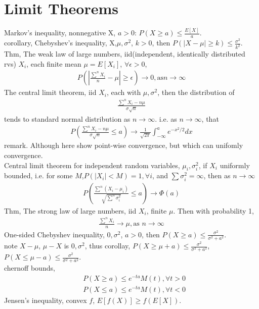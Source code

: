 \documentclass[paper=a4, fontsize=11pt]{scrartcl} %
\numberwithin{equation}{section} %
\numberwithin{figure}{section} %
\numberwithin{table}{section} %
\begin{document}
\section{Limit Theorems}
Markov's inequality, nonnegative X, $a>0$: $P(X\geq a) \leq \frac{E[X]}{a}$.\\
corollary, Chebyshev's inequality, X,$\mu,\sigma^2$, $k>0$, then  $P(|X-\mu|\geq k)\leq \frac{\sigma^2}{k^2}$.\\
Thm, The weak law of large numbers, iid(independent, identically distributed rvs) $X_i$, each finite mean $\mu=E[X_i]$, $\forall \epsilon>0$,
\begin{align}
	P(|\frac{\sum^n X_i}{n} - \mu|\geq \epsilon) \rightarrow 0, \text{as} n\rightarrow \infty
\end{align}
The central limit theorem, iid $X_i$, each with $\mu,\sigma^2$, then the distribution of 
\begin{align}
	\frac{\sum^n X_i - n\mu}{\sigma \sqrt{n}}
\end{align}
tends to standard normal distribution as $n\rightarrow \infty$. i.e. as $n\rightarrow \infty$, that
\begin{align}
	P\left(\frac{\sum^n X_i - n\mu}{\sigma \sqrt{n}} \leq a\right) \rightarrow 
	\frac{1}{\sqrt{2\pi}}\int_{-\infty}^a e^{-x^2/2}dx
\end{align}
remark. Although here show point-wise convergence, but which can unifomly convergence.\\
Central limit theorem for independent random variables, $\mu_i,\sigma_i^2$, if $X_i$ uniformly bounded, i.e. for some $M$,$P(|X_i|<M)=1,\forall i$, and $\sum \sigma_i^2=\infty$, then as $n\rightarrow \infty$
\begin{align}
	P\left(\frac{\sum^n (X_i-\mu_i)}{\sqrt{\sum^n \sigma_i^2}}\leq a\right)\rightarrow \Phi(a)
\end{align}
Thm, The strong law of large numbers, iid $X_i$, finite $\mu$. Then with probability 1,
\begin{align}
	\frac{\sum^n X_i}{n} \rightarrow \mu,\text{as }n\rightarrow \infty
\end{align}
One-sided Chebyshev inequality, $0,\sigma^2$, $a>0$, then $P(X\geq a)\leq \frac{\sigma^2}{\sigma^2+a^2}$.\\
note $X-\mu$, $\mu-X$ is $0,\sigma^2$, thus
corollay, $P(X\geq \mu +a )\leq \frac{\sigma^2}{\sigma^2+a^2}$, $P(X\leq \mu -a)\leq \frac{\sigma^2}{\sigma^2+a^2}$.\\
chernoff bounds, 
\begin{align}
	&P(X\geq a) \leq e^{-ta} M(t), \forall t>0 \\
	&P(X\leq a) \leq e^{-ta} M(t), \forall t<0 
\end{align}
Jensen's inequality, convex $f$, $E[f(X)]\geq f(E[X])$.
\end{document}
